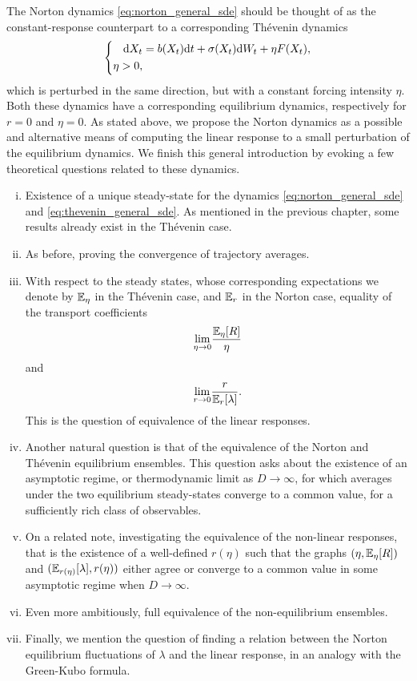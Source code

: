 The Norton dynamics \eqref{eq:norton_general_sde} should be thought of as the constant-response counterpart to a corresponding Thévenin dynamics
\begin{equation}
        \label{eq:thevenin_general_sde}
    \left\{\begin{aligned}
        \mathrm{d} X_t &= b(X_t)\mathrm{d} t +\sigma(X_t)\mathrm{d} W_t + \eta F(X_t),\\
        \eta>0,
    \end{aligned}\right.
\end{equation}
which is perturbed in the same direction, but with a constant forcing intensity $\eta$. Both these dynamics have a corresponding equilibrium dynamics, respectively for $r=0$ and $\eta=0$. 
As stated above, we propose the Norton dynamics as a possible and alternative means of computing the linear response to a small perturbation of the equilibrium dynamics. 
We finish this general introduction by evoking a few theoretical questions related to these dynamics.
\begin{enumerate}[(i)]
    \item Existence of a unique steady-state for the dynamics \eqref{eq:norton_general_sde} and \eqref{eq:thevenin_general_sde}. As mentioned in the previous chapter, some results already exist in the Thévenin case.
    \item As before, proving the convergence of trajectory averages.
    \item With respect to the steady states, whose corresponding expectations we denote by $\mathbb{E}_\eta$ in the Thévenin case, and $\mathbb{E}_r$ in the Norton case, equality of the transport coefficients \[\underset{\eta \to 0}{\lim}\frac{\mathbb{E}_\eta[R]}{\eta}\] and \[\underset{r\to 0}{\lim}\frac{r}{\mathbb{E}_r[\lambda]}.\] This is the question of equivalence of the linear responses.
    \item Another natural question is that of the equivalence of the Norton and Thévenin equilibrium ensembles. This question asks about the existence of an asymptotic regime, or thermodynamic limit as $D\to\infty$, for which averages under the two equilibrium steady-states converge to a common value, for a sufficiently rich class of observables.
    \item On a related note, investigating the equivalence of the non-linear responses, that is the existence of a well-defined $r(\eta)$ such that the graphs $(\eta,\mathbb{E}_\eta[R])$ and $(\mathbb{E}_{r(\eta)}[\lambda],r(\eta))$ either agree or converge to a common value in some asymptotic regime when $D\to\infty$.
    \item Even more ambitiously, full equivalence of the non-equilibrium ensembles.
    \item Finally, we mention the question of finding a relation between the Norton equilibrium fluctuations of $\lambda$ and the linear response, in an analogy with the Green-Kubo formula.
\end{enumerate}
